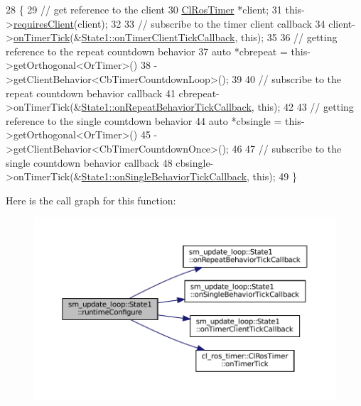 \begin{DoxyCode}
28     \{
29         \textcolor{comment}{// get reference to the client}
30         \hyperlink{classcl__ros__timer_1_1ClRosTimer}{ClRosTimer} *client;
31         this->\hyperlink{classsmacc_1_1ISmaccState_a7f95c9f0a6ea2d6f18d1aec0519de4ac}{requiresClient}(client);
32 
33         \textcolor{comment}{// subscribe to the timer client callback}
34         client->\hyperlink{classcl__ros__timer_1_1ClRosTimer_a7edcc057bfb5a25fe0892755137dd8da}{onTimerTick}(&\hyperlink{structsm__update__loop_1_1State1_af132641f3167a2224249c70d072b6574}{State1::onTimerClientTickCallback},
       \textcolor{keyword}{this});
35 
36         \textcolor{comment}{// getting reference to the repeat countdown behavior}
37         \textcolor{keyword}{auto} *cbrepeat = this->getOrthogonal<OrTimer>()
38                              ->getClientBehavior<CbTimerCountdownLoop>();
39 
40         \textcolor{comment}{// subscribe to the repeat countdown behavior callback}
41         cbrepeat->onTimerTick(&\hyperlink{structsm__update__loop_1_1State1_aba8ce8c18482665237b1a5cb28deb657}{State1::onRepeatBehaviorTickCallback}, \textcolor{keyword}{
      this});
42 
43         \textcolor{comment}{// getting reference to the single countdown behavior}
44         \textcolor{keyword}{auto} *cbsingle = this->getOrthogonal<OrTimer>()
45                              ->getClientBehavior<CbTimerCountdownOnce>();
46 
47         \textcolor{comment}{// subscribe to the single countdown behavior callback}
48         cbsingle->onTimerTick(&\hyperlink{structsm__update__loop_1_1State1_ad15fb64f4f918c423038180d434d7220}{State1::onSingleBehaviorTickCallback}, \textcolor{keyword}{
      this});
49     \}
\end{DoxyCode}
Here is the call graph for this function\+:
\nopagebreak
\begin{figure}[H]
\begin{center}
\leavevmode
\includegraphics[width=350pt]{structsm__update__loop_1_1State1_a9a4c0a2a171bc9c2d7686562000075b4_cgraph}
\end{center}
\end{figure}
\mbox{\label{structsm__update__loop_1_1State1_a54b1ae508eb3d814fb2d811d78298b0e}} 
